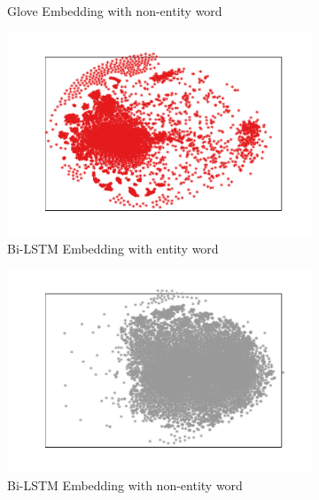 \documentclass{article}
\begin{document}
\begin{figure}[t]
\begin{subfigure}{0.24\textwidth}
		\caption{Glove Embedding with non-entity word}
		\label{fig:glove_negative}
	\end{subfigure}\hfil
	\begin{subfigure}{0.24\textwidth}
	\includegraphics[width=\linewidth]{bi_lstm_gold_positive.pdf}
	\caption{Bi-LSTM Embedding with entity word}
	\label{fig:bi_lstm_gold_positive}
\end{subfigure}\hfil 
\begin{subfigure}{0.24\textwidth}
	\includegraphics[width=\linewidth]{bi_lstm_gold_negative.pdf}
	\caption{Bi-LSTM Embedding with non-entity word}
	\label{fig:bi_lstm_gold_negative}
\end{subfigure}
\bigskip
\begin{subfigure}{0.24\textwidth}

\end{subfigure}
\end{figure}
\end{document}
